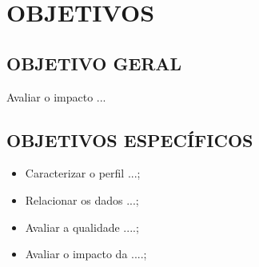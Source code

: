 \chapter{OBJETIVOS}
\section{OBJETIVO GERAL}
Avaliar o impacto ...

\section{OBJETIVOS ESPECÍFICOS}
\begin{itemize}
\item Caracterizar o perfil ...; 

\item Relacionar os dados ...;

\item Avaliar a qualidade ....;

\item Avaliar o impacto da ....;
\end{itemize}